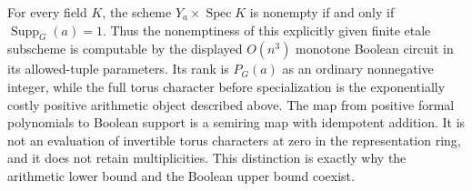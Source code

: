For every field $K$, the scheme $Y_a\times\operatorname{Spec}K$
is nonempty if and only if $\operatorname{Supp}_G(a)=1$.
Thus the nonemptiness of this explicitly given finite etale
subscheme is computable by the displayed $O(n^3)$ monotone
Boolean circuit in its allowed-tuple parameters.  Its rank is
$P_G(a)$ as an ordinary nonnegative integer, while the full
torus character before specialization is the exponentially
costly positive arithmetic object described above.  The map
from positive formal polynomials to Boolean support is a
semiring map with idempotent addition.  It is not an evaluation
of invertible torus characters at zero in the representation
ring, and it does not retain multiplicities.  This distinction
is exactly why the arithmetic lower bound and the Boolean
upper bound coexist.
